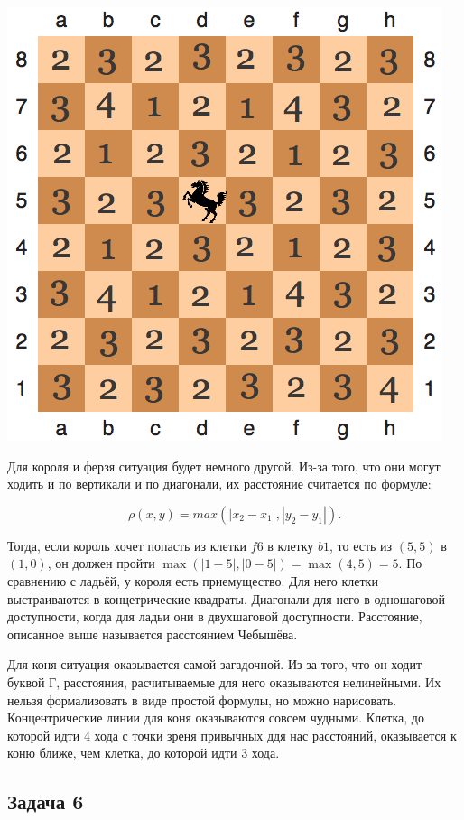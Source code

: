 \documentclass[12pt, a4paper, oneside]{article}
\begin{document}
{\begin{minipage}[t]{0.45\textwidth}
	\includegraphics[scale=0.5]{koni.png}
\end{minipage}

Для короля и ферзя ситуация будет немного другой. Из-за того, что они могут ходить и по вертикали и по диагонали, их расстояние считается по формуле:

\[ \rho(x,y) = max( |x_2 - x_1|, |y_2 - y_1| ). \]

Тогда, если король хочет попасть из клетки $f6$ в клетку $b1$, то есть из $(5,5)$ в $(1,0)$, он должен пройти $\max(|1-5|, |0-5|) = \max(4, 5) = 5$. По сравнению с ладьёй, у короля есть приемущество. Для него клетки выстраиваются в концетрические квадраты. Диагонали для него в одношаговой доступности, когда для ладьи они в двухшаговой доступности. Расстояние, описанное выше называется расстоянием Чебышёва. 

Для коня ситуация оказывается самой загадочной. Из-за того, что он ходит буквой Г, расстояния, расчитываемые для него оказываются нелинейными. Их нельзя формализовать в виде простой формулы, но можно нарисовать. Концентрические линии для коня оказываются совсем чудными. Клетка, до которой идти $4$ хода с точки зреня привычных ддя нас расстояний, оказывается к коню ближе, чем клетка, до которой идти $3$ хода. 
}{ }


\subsection*{Задача 6} 
\end{document}
